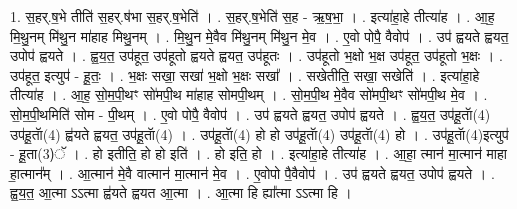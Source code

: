 \documentclass[17pt]{extarticle}
\begin{document}
1. स॒हर्.ष॒भे तीति॑ स॒हर्.ष॑भा स॒हर्.ष॒भेति॑ । . स॒हर्.ष॒भेति॑ स॒ह - ऋ॒ष॒भा॒ । . इत्या॑हा॒हे तीत्या॑ह । . आ॒ह॒ मि॒थु॒नम् मि॑थु॒न मा॑हाह मिथु॒नम् । . मि॒थु॒न मे॒वैव मि॑थु॒नम् मि॑थु॒न मे॒व । . ए॒वो पोपै॒ वैवोप॑ । . उप॑ ह्वयते ह्वयत॒ उपोप॑ ह्वयते । . ह्व॒य॒त॒ उप॑हूत॒ उप॑हूतो ह्वयते ह्वयत॒ उप॑हूतः । . उप॑हूतो भ॒क्षो भ॒क्ष उप॑हूत॒ उप॑हूतो भ॒क्षः । . उप॑हूत॒ इत्युप॑ - हू॒तः॒ । . भ॒क्षः सखा॒ सखा॑ भ॒क्षो भ॒क्षः सखा᳚ । . सखेतीति॒ सखा॒ सखेति॑ । . इत्या॑हा॒हे तीत्या॑ह । . आ॒ह॒ सो॒म॒पी॒थꣳ सो॑मपी॒थ मा॑हाह सोमपी॒थम् । . सो॒म॒पी॒थ मे॒वैव सो॑मपी॒थꣳ सो॑मपी॒थ मे॒व । . सो॒म॒पी॒थमिति॑ सोम - पी॒थम् । . ए॒वो पोपै॒ वैवोप॑ । . उप॑ ह्वयते ह्वयत॒ उपोप॑ ह्वयते । . ह्व॒य॒त॒ उप॑हू॒ताॅ(4) उप॑हू॒ताॅ(4) ह्व॑यते ह्वयत॒ उप॑हू॒ताॅ(4) । . उप॑हू॒ताॅ(4) हो हो उप॑हू॒ताॅ(4) उप॑हू॒ताॅ(4) हो । . उप॑हू॒ताॅ(4)इत्युप॑ - हू॒ता(3)ॅ । . हो इतीति॒ हो हो इति॑ । . हो इति॒ हो । . इत्या॑हा॒हे तीत्या॑ह । . आ॒हा॒ त्मान॑ मा॒त्मान॑ माहा हा॒त्मान᳚म् । . आ॒त्मान॑ मे॒वै वात्मान॑ मा॒त्मान॑ मे॒व । . ए॒वोपो पै॒वैवोप॑ । . उप॑ ह्वयते ह्वयत॒ उपोप॑ ह्वयते । . ह्व॒य॒त॒ आ॒त्मा ऽऽत्मा ह्व॑यते ह्वयत आ॒त्मा । . आ॒त्मा हि ह्या᳚त्मा ऽऽत्मा हि । \newline
\end{document}
